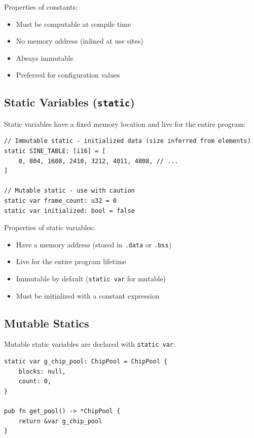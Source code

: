 Properties of constants:
\begin{itemize}
    \item Must be computable at compile time
    \item No memory address (inlined at use sites)
    \item Always immutable
    \item Preferred for configuration values
\end{itemize}

\subsection{Static Variables (\texttt{static})}
\label{subsec:static-vars}

Static variables have a fixed memory location and live for the entire program:

\begin{lstlisting}
// Immutable static - initialized data (size inferred from elements)
static SINE_TABLE: [i16] = [
    0, 804, 1608, 2410, 3212, 4011, 4808, // ...
]

// Mutable static - use with caution
static var frame_count: u32 = 0
static var initialized: bool = false
\end{lstlisting}

Properties of static variables:
\begin{itemize}
    \item Have a memory address (stored in \texttt{.data} or \texttt{.bss})
    \item Live for the entire program lifetime
    \item Immutable by default (\texttt{static var} for mutable)
    \item Must be initialized with a constant expression
\end{itemize}

\subsection{Mutable Statics}
\label{subsec:mutable-statics}

Mutable static variables are declared with \texttt{static var}:

\begin{lstlisting}
static var g_chip_pool: ChipPool = ChipPool {
    blocks: null,
    count: 0,
}

pub fn get_pool() -> *ChipPool {
    return &var g_chip_pool
}
\end{lstlisting}

